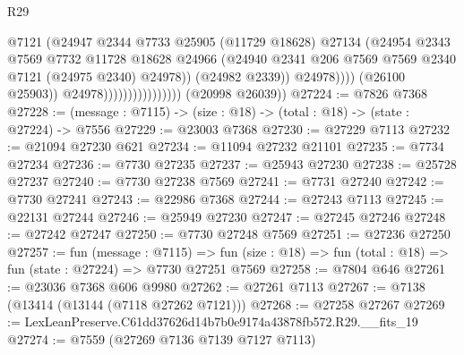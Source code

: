 \begin{lexlean}{R29}
\begin{coremodule}
                                                @7121
                                                (@24947
                                                  @2344
                                                  @7733
                                                  @25905
                                                  (@11729 @18628)
                                                  @27134
                                                  (@24954
                                                    @2343
                                                    @7569
                                                    @7732
                                                    @11728
                                                    @18628
                                                    @24966
                                                    (@24940
                                                      @2341
                                                      @206
                                                      @7569
                                                      @7569
                                                      @2340
                                                      @7121
                                                      (@24975 @2340)
                                                      @24978))
                                                  (@24982 @2339))
                                                @24978))))
                                        (@26100 @25903))
                                      @24978))))))))))))))))
      (@20998 @26039))
@27224 := @7826 @7368
@27228 := (message : @7115) -> (size : @18) -> (total : @18) -> (state : @27224) -> @7556
@27229 := @23003 @7368
@27230 := @27229 @7113
@27232 := @21094 @27230 @621
@27234 := @11094 @27232 @21101
@27235 := @7734 @27234
@27236 := @7730 @27235
@27237 := @25943 @27230
@27238 := @25728 @27237
@27240 := @7730 @27238 @7569
@27241 := @7731 @27240
@27242 := @7730 @27241
@27243 := @22986 @7368
@27244 := @27243 @7113
@27245 := @22131 @27244
@27246 := @25949 @27230
@27247 := @27245 @27246
@27248 := @27242 @27247
@27250 := @7730 @27248 @7569
@27251 := @27236 @27250
@27257 := fun (message : @7115) =>
  fun (size : @18) => fun (total : @18) => fun (state : @27224) => @7730 @27251 @7569
@27258 := @7804 @646
@27261 := @23036 @7368 @606 @9980
@27262 := @27261 @7113
@27267 := @7138 (@13414 (@13144 (@7118 @27262 @7121)))
@27268 := @27258 @27267
@27269 := LexLeanPreserve.C61dd37626d14b7b0e9174a43878fb572.R29.__fits_19
@27274 := @7559 (@27269 @7136 @7139 @7127 @7113)

\end{coremodule}
\end{lexlean}
